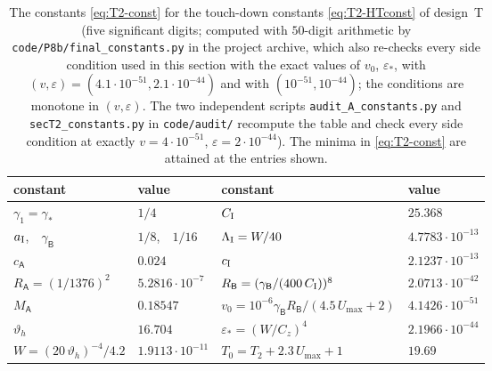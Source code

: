 \begin{table}[ht]
\centering
\begin{tabular}{@{}llll@{}}
\toprule
constant & value & constant & value\\
\midrule
$\gamma_1=\gamma_*$ & $1/4$ & $C_{\mathrm I}$ & $25.368$\\
$a_{\mathrm I}$,\ \ $\gamma_{\mathsf B}$ & $1/8$,\ \ $1/16$ & $\Lambda_{\mathrm I}=W/40$ & $4.7783\cdot10^{-13}$\\
$c_{\mathsf A}$ & $0.024$ & $c_{\mathrm I}$ & $2.1237\cdot10^{-13}$\\
$R_{\mathsf A}=(1/1376)^2$ & $5.2816\cdot10^{-7}$ & $R_{\mathsf B}=(\gamma_{\mathsf B}/(400\,C_{\mathrm I}))^8$ & $2.0713\cdot10^{-42}$\\
$M_{\mathsf A}$ & $0.18547$ & $v_0=10^{-6}\gamma_{\mathsf B}R_{\mathsf B}/(4.5\,U_{\max}+2)$ & $4.1426\cdot10^{-51}$\\
$\vartheta_h$ & $16.704$ & $\varepsilon_*=(W/C_z)^4$ & $2.1966\cdot10^{-44}$\\
$W=(20\,\vartheta_h)^{-4}/4.2$ & $1.9113\cdot10^{-11}$ & $T_0=T_2+2.3\,U_{\max}+1$ & $19.69$\\
\bottomrule
\end{tabular}
\caption{The constants \eqref{eq:T2-const} for the touch-down constants \eqref{eq:T2-HTconst} of design~T (five significant
digits; computed with $50$-digit arithmetic by \texttt{code/P8b/final\_constants.py} in the project archive, which also re-checks
every side condition used in this section with the exact values of $v_0$, $\varepsilon_*$, with
$(v,\varepsilon)=(4.1\cdot10^{-51},2.1\cdot10^{-44})$ and with $(10^{-51},10^{-44})$; the conditions are monotone in
$(v,\varepsilon)$. The two independent scripts \texttt{audit\_A\_constants.py} and \texttt{secT2\_constants.py} in
\texttt{code/audit/} recompute the table and check every side condition at exactly $v=4\cdot10^{-51}$,
$\varepsilon=2\cdot10^{-44}$). The minima
in \eqref{eq:T2-const} are attained at the entries shown.}\label{tab:T2-const}
\end{table}

